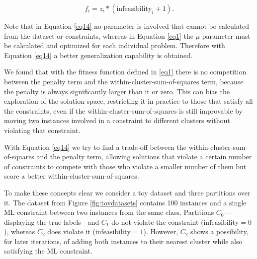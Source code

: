\begin{equation}
f_i = z_i * (\text{infeasibility}_i + 1).
\label{eq14}
\end{equation}

Note that in Equation \eqref{eq14} no parameter is involved that cannot be calculated from the dataset or constraints, whereas in Equation \eqref{eq1} the $\mu$ parameter must be calculated and optimized for each individual problem. Therefore with Equation \eqref{eq14} a better generalization capability is obtained.

We found that with the fitness function defined in \eqref{eq1} there is no competition between the penalty term and the within-cluster-sum-of-squares term, because the penalty is always significantly larger than it or zero. This can bias the exploration of the solution space, restricting it in practice to those that satisfy all the constraints, even if the within-cluster-sum-of-squares is still improvable by moving two instances involved in a constraint to different clusters without violating that constraint.

With Equation \eqref{eq14} we try to find a trade-off between the within-cluster-sum-of-squares and the penalty term, allowing solutions that violate a certain number of constraints to compete with those who violate a smaller number of them but score a better within-cluster-sum-of-squares.

To make these concepts clear we consider a toy dataset and three partitions over it. The dataset from Figure \ref{fig:toydatasets} contains 100 instances and a single ML constraint between two instances from the same class. Partitions $C_0$---displaying the true labels---and $C_1$ do not violate the constraint ($\text{infeasibility} = 0$), whereas $C_2$ does violate it ($\text{infeasibility} = 1$). However, $C_2$ shows a possibility, for later iterations, of adding both instances to their nearest cluster while also satisfying the ML constraint.

